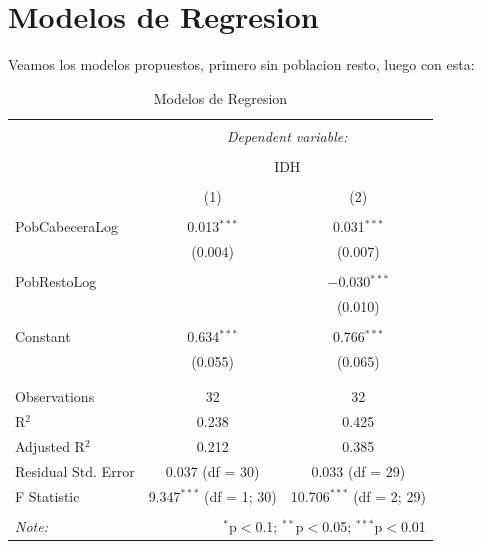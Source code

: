 \documentclass{article}
\begin{document}
\section{Modelos de Regresion}\label{regresion}

Veamos los modelos propuestos, primero sin poblacion resto, luego con esta:
\begin{table}[!htbp] \centering 
  \caption{Modelos de Regresion} 
  \label{regresiones} 
\begin{tabular}{@{\extracolsep{5pt}}lcc} 
\\[-1.8ex]\hline 
\hline \\[-1.8ex] 
 & \multicolumn{2}{c}{\textit{Dependent variable:}} \\ 
\cline{2-3} 
\\[-1.8ex] & \multicolumn{2}{c}{IDH} \\ 
\\[-1.8ex] & (1) & (2)\\ 
\hline \\[-1.8ex] 
 PobCabeceraLog & 0.013$^{***}$ & 0.031$^{***}$ \\ 
  & (0.004) & (0.007) \\ 
  & & \\ 
 PobRestoLog &  & $-$0.030$^{***}$ \\ 
  &  & (0.010) \\ 
  & & \\ 
 Constant & 0.634$^{***}$ & 0.766$^{***}$ \\ 
  & (0.055) & (0.065) \\ 
  & & \\ 
\hline \\[-1.8ex] 
Observations & 32 & 32 \\ 
R$^{2}$ & 0.238 & 0.425 \\ 
Adjusted R$^{2}$ & 0.212 & 0.385 \\ 
Residual Std. Error & 0.037 (df = 30) & 0.033 (df = 29) \\ 
F Statistic & 9.347$^{***}$ (df = 1; 30) & 10.706$^{***}$ (df = 2; 29) \\ 
\hline 
\hline \\[-1.8ex] 
\textit{Note:}  & \multicolumn{2}{r}{$^{*}$p$<$0.1; $^{**}$p$<$0.05; $^{***}$p$<$0.01} \\ 
\end{tabular} 
\end{table} \clearpage
\end{document}

